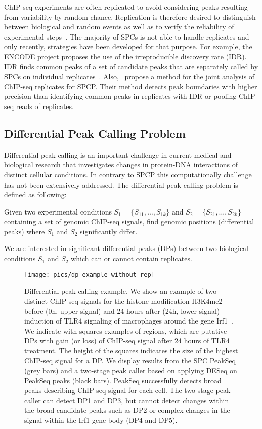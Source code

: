 ChIP-seq experiments are often replicated to avoid considering peaks resulting from variability by random chance.
Replication is therefore desired to distinguish between biological and random events as well as to verify the reliability of experimental steps~\citep{park2009}.
The majority of SPCs is not able to handle replicates and only recently, strategies have been developed for that purpose.
For example, the ENCODE project proposes the use of the irreproducible discovery rate (IDR).
IDR finds common peaks of a set of candidate peaks that are separately called by SPCs on individual replicates~\citep{landt2012,Li2011}. 
Also,~\cite{Ibrahim2015} propose a method for the joint analysis of ChIP-seq replicates for SPCP. 
Their method detects peak boundaries with higher precision than identifying common peaks in replicates with IDR or pooling ChIP-seq reads of replicates.

\subsection{Differential Peak Calling Problem}
Differential peak calling is an important challenge in current medical and biological research that investigates changes in protein-DNA interactions of distinct cellular conditions.
In contrary to SPCP this computationally challenge has not been extensively addressed.
The differential peak calling problem is defined as following:

\begin{mydef}
  Given two experimental conditions $S_1 = \{S_{11}, \ldots, S_{1k}\}$ and $S_2 = \{S_{21}, \ldots, S_{2k}\}$ containing a set of genomic ChIP-seq signals, find genomic positions (differential peaks) where $S_1$ and $S_2$ significantly differ.
\end{mydef}

\noindent
We are interested in significant differential peaks (DPs) between two biological conditions $S_1$ and $S_2$ which can or cannot contain replicates.

\begin{figure}[ht]
  \centering
  \texttt{[image: pics/dp\_example\_without\_rep]}
\caption[Differential peak calling example]{Differential peak calling example. 
We show an example of two distinct ChIP-seq signals for the histone modification H3K4me2 before (0h, upper signal) and 24 hours after (24h, lower signal) induction of TLR4 signaling of macrophages around the gene Irf1~\citep{kaikonnen2013}. 
We indicate with squares examples of regions, which are putative DPs with gain (or loss) of ChIP-seq signal after 24 hours of TLR4 treatment. 
The height of the squares indicates the size of the highest ChIP-seq signal for a DP. 
We display results from the SPC PeakSeq (grey bars) and a two-stage peak caller based on applying DESeq on PeakSeq peaks (black bars). 
PeakSeq successfully detects broad peaks describing ChIP-seq signal for each cell. 
The two-stage peak caller can detect DP1 and DP3, but cannot detect changes within the broad candidate peaks such as DP2 or complex changes in the signal within the Irf1 gene body (DP4 and DP5). 
}
\label{pic_dp_example}
\end{figure}

